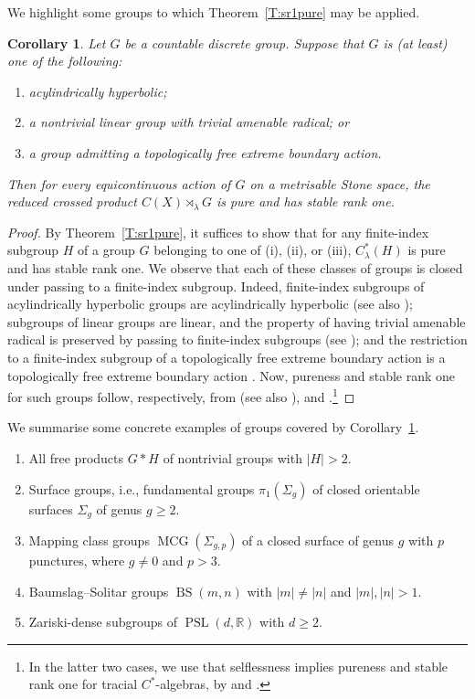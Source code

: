 \documentclass[11pt,a4,leqno]{amsart}
\newtheorem{cor}[thm]{Corollary}
\theoremstyle{definition}
\theoremstyle{remark}
\numberwithin{equation}{section}
\theoremstyle{plain}
\newcommand{\Rb}{\mathbb{R}}
\begin{document}
We highlight some groups to which Theorem~\ref{T:sr1pure} may be applied. 

\begin{cor}\label{C:sr1pure}
    Let $G$ be a countable discrete group. Suppose that $G$ is (at least) one of the following:
    \begin{enumerate}
        \item acylindrically hyperbolic; 
        \item a nontrivial linear group with trivial amenable radical; or 
        \item a group admitting a topologically free extreme boundary action. 
    \end{enumerate}
    Then for every equicontinuous action of $G$ on a metrisable Stone space, the reduced crossed product $C(X)\rtimes_\lambda G$ is pure and has stable rank one. 
\end{cor}

\begin{proof}
    By Theorem~\ref{T:sr1pure}, it suffices to show that for any finite-index subgroup $H$ of a group $G$ belonging to one of (i), (ii), or (iii), $C^*_\lambda(H)$ is pure and has stable rank one. We observe that each of these classes of groups is closed under passing to a finite-index subgroup. Indeed, finite-index subgroups of acylindrically hyperbolic groups are acylindrically hyperbolic \cite[Lemma 3.9]{MinOsi15} (see also \cite[Lemma 1]{MinOsi19}); subgroups of linear groups are linear, and the property of having trivial amenable radical is preserved by passing to finite-index subgroups (see \cite[Lemma 2.2]{RauThiVil25}); and the restriction to a finite-index subgroup of a topologically free extreme boundary action is a topologically free extreme boundary action \cite[Proposition 1.3]{FloKliCobPag26}. Now, pureness and stable rank one for such groups follow, respectively, from \cite[Corollary D]{FloKliCobPag26} (see also \cite{AmrGaoKunPat25,Rau25,RauThiVil25}), \cite[Theorem 1.4]{Vig26} and \cite[Theorem 11]{Oza25}.\footnote{In the latter two cases, we use that selflessness implies pureness and stable rank one for tracial $C^*$-algebras, by \cite[Theorem 5.13]{AntPerThiVil24} and \cite[Theorem 3.1]{Rob25}.}
\end{proof}

We summarise some concrete examples of groups covered by Corollary~\ref{C:sr1pure}. 

\begin{enumerate}
    \item All free products $G * H$ of nontrivial groups with $|H| > 2$. 
    \item Surface groups, i.e., fundamental groups $\pi_1(\Sigma_g)$ of closed orientable surfaces $\Sigma_g$ of genus $g\ge 2$. 
    \item Mapping class groups $\operatorname{MCG}(\Sigma_{g,p})$ of a closed surface of genus $g$ with $p$ punctures, where $g \ne 0$ and $p > 3$. 
    \item Baumslag--Solitar groups $\operatorname{BS}(m,n)$ with $|m|\ne |n|$ and $|m|,|n| > 1$. 
    \item Zariski-dense subgroups of $\operatorname{PSL}(d,\Rb)$ with $d\ge 2$.
\end{enumerate}
\end{document}
